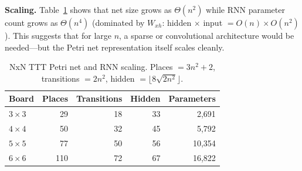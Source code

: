 \documentclass[11pt,a4paper]{article}
\begin{document}
\medskip
\noindent\textbf{Scaling.}\quad
Table~\ref{tab:nxn-scaling} shows that net size grows as $\Theta(n^2)$
while RNN parameter count grows as $\Theta(n^4)$ (dominated by
$W_{xh}$: hidden $\times$ input $= O(n) \times O(n^2)$).
This suggests that for large $n$, a sparse or convolutional
architecture would be needed---but the Petri net representation itself
scales cleanly.

\begin{table}[h]
\centering
\begin{tabular}{lrrrr}
\toprule
Board & Places & Transitions & Hidden & Parameters \\
\midrule
$3{\times}3$ & 29 & 18 & 33 & 2{,}691 \\
$4{\times}4$ & 50 & 32 & 45 & 5{,}792 \\
$5{\times}5$ & 77 & 50 & 56 & 10{,}354 \\
$6{\times}6$ & 110 & 72 & 67 & 16{,}822 \\
\bottomrule
\end{tabular}
\caption{NxN TTT Petri net and RNN scaling.  Places $= 3n^2 + 2$,
transitions $= 2n^2$, hidden $= \lfloor 8\sqrt{2n^2} \rfloor$.}
\label{tab:nxn-scaling}
\end{table}
\end{document}

